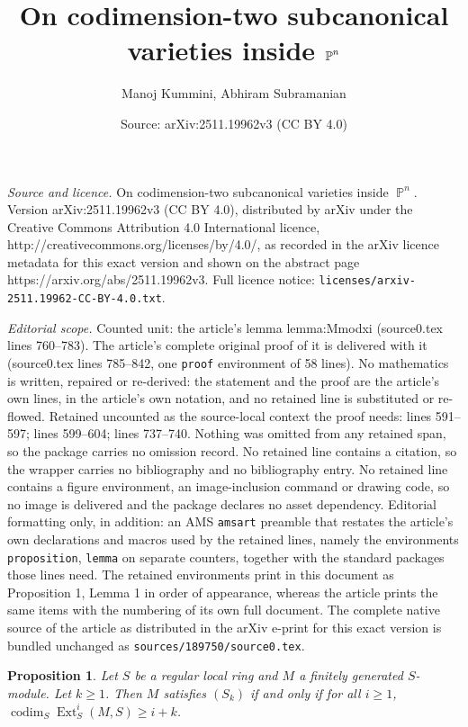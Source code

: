 \documentclass[10pt,a4paper]{amsart}
\title{On codimension-two subcanonical varieties inside $\projective^n$}
\author{Manoj Kummini, Abhiram Subramanian}
\date{Source: arXiv:2511.19962v3 (CC BY 4.0)}
\DeclareMathOperator{\projective}{\mathbb{P}}
\newtheorem{proposition}{Proposition}
\DeclareMathOperator{\Ext}{Ext}
\DeclareMathOperator{\codim}{codim}
\begin{document}
\maketitle

\noindent\emph{Source and licence.} On codimension-two subcanonical varieties inside $\projective^n$. Version arXiv:2511.19962v3 (CC BY 4.0), distributed by arXiv under the Creative Commons Attribution 4.0 International licence, http://creativecommons.org/licenses/by/4.0/, as recorded in the arXiv licence metadata for this exact version and shown on the abstract page https://arxiv.org/abs/2511.19962v3. Full licence notice: \texttt{licenses/arxiv-2511.19962-CC-BY-4.0.txt}.\par\smallskip

\noindent\textit{Editorial scope.} Counted unit: the article's lemma lemma:Mmodxi (source0.tex lines 760--783). The article's complete original proof of it is delivered with it (source0.tex lines 785--842, one \texttt{proof} environment of 58 lines). No mathematics is written, repaired or re-derived: the statement and the proof are the article's own lines, in the article's own notation, and no retained line is substituted or re-flowed.  Retained uncounted as the source-local context the proof needs: lines 591--597; lines 599--604; lines 737--740.  Nothing was omitted from any retained span, so the package carries no omission record.  No retained line contains a citation, so the wrapper carries no bibliography and no bibliography entry.  No retained line contains a figure environment, an image-inclusion command or drawing code, so no image is delivered and the package declares no asset dependency.  Editorial formatting only, in addition: an AMS \texttt{amsart} preamble that restates the article's own declarations and macros used by the retained lines, namely the environments \texttt{proposition}, \texttt{lemma} on separate counters, together with the standard packages those lines need.  The retained environments print in this document as Proposition 1, Lemma 1 in order of appearance, whereas the article prints the same items with the numbering of its own full document.  The complete native source of the article as distributed in the arXiv e-print for this exact version is bundled unchanged as \texttt{sources/189750/source0.tex}.
\begin{proposition}
\label{proposition:SkAndExt}
Let $S$ be a regular local ring and $M$ a finitely generated $S$-module.
Let $k \geq 1$.
Then $M$ satisfies $(S_k)$ if and only if for all $i \geq 1$, $\codim_S
\Ext_S^i(M,S ) \geq i+k$.
\end{proposition}
\end{document}
